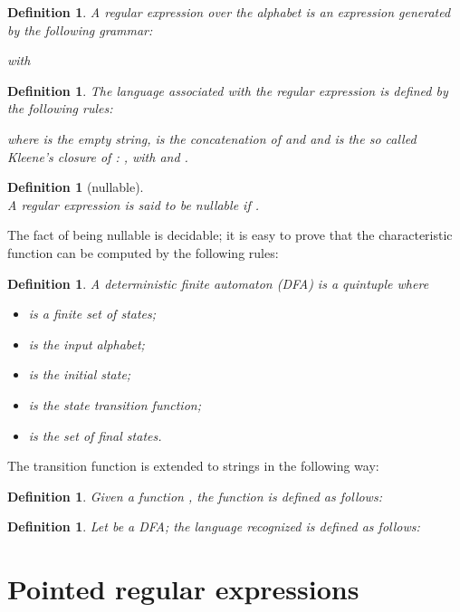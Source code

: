 \documentclass[preprint]{sigplanconf}
\newcounter{item}
\newtheorem{definition}[item]{Definition}
\begin{document}
\begin{definition}
A regular expression over the alphabet  is 
an expression  generated by the following grammar:

with 
\end{definition}

\begin{definition}
The language  associated with the regular expression  
is defined by the following rules:

where  is the empty string, 
 is the
concatenation of  and 
and  is the so called Kleene's closure of : , with  and .
\end{definition}

\begin{definition}[nullable]~\\
A regular expression  is said to be nullable if .
\end{definition}

\noindent
The fact of being  nullable is decidable; it is easy to prove that the 
characteristic function  can be computed by the following 
rules:


\begin{definition}
A deterministic finite automaton (DFA) is a quintuple  
where
\begin{itemize}
\item  is a finite set of states;
\item  is the input alphabet;
\item  is the initial state;
\item  is the state transition function;
\item  is the set of final states.
\end{itemize}
\end{definition}

\noindent
The transition function  is extended to strings in the following way:

\begin{definition}Given a function , 
the function  is defined as follows:

\end{definition}

\begin{definition}
Let  be a DFA; the language recognized 
 is defined as follows:

\end{definition}

\section{Pointed regular expressions}
\end{document}
